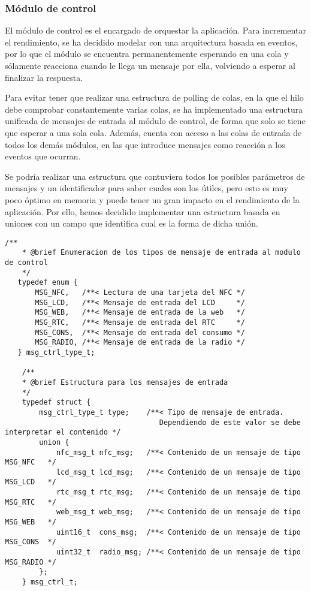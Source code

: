 \subsubsection{Módulo de control}

El módulo de control es el encargado de orquestar la aplicación. Para incrementar el rendimiento, se ha decidido modelar con una arquitectura basada en eventos, por lo que el módulo se encuentra permanentemente esperando en una cola y sólamente reacciona cuando le llega un mensaje por ella, volviendo a esperar al finalizar la respuesta.

Para evitar tener que realizar una estructura de polling de colas, en la que el hilo debe comprobar constantemente varias colas, se ha implementado una estructura unificada de mensajes de entrada al módulo de control, de forma que solo se tiene que esperar a una sola cola. Además, cuenta con acceso a las colas de entrada de todos los demás módulos, en las que introduce mensajes como reacción a los eventos que ocurran.

Se podría realizar una estructura que contuviera todos los posibles parámetros de mensajes y un identificador para saber cuales son los útiles, pero esto es muy poco óptimo en memoria y puede tener un gran impacto en el rendimiento de la aplicación. Por ello, hemos decidido implementar una estructura basada en uniones con un campo que identifica cual es la forma de dicha unión. 

\begin{lstlisting}[captionpos=t, caption={Estructura para los mensajes al control}]
    /**
    * @brief Enumeracion de los tipos de mensaje de entrada al modulo de control
    */
   typedef enum {
       MSG_NFC,   /**< Lectura de una tarjeta del NFC */
       MSG_LCD,   /**< Mensaje de entrada del LCD     */
       MSG_WEB,   /**< Mensaje de entrada de la web   */
       MSG_RTC,   /**< Mensaje de entrada del RTC     */
       MSG_CONS,  /**< Mensaje de entrada del consumo */
       MSG_RADIO, /**< Mensaje de entrada de la radio */
   } msg_ctrl_type_t;

    /**
    * @brief Estructura para los mensajes de entrada
    */
    typedef struct {
        msg_ctrl_type_t type;    /**< Tipo de mensaje de entrada. 
                                    Dependiendo de este valor se debe interpretar el contenido */
        union {
            nfc_msg_t nfc_msg;   /**< Contenido de un mensaje de tipo MSG_NFC   */
            lcd_msg_t lcd_msg;   /**< Contenido de un mensaje de tipo MSG_LCD   */
            rtc_msg_t rtc_msg;   /**< Contenido de un mensaje de tipo MSG_RTC   */
            web_msg_t web_msg;   /**< Contenido de un mensaje de tipo MSG_WEB   */
            uint16_t  cons_msg;  /**< Contenido de un mensaje de tipo MSG_CONS  */
            uint32_t  radio_msg; /**< Contenido de un mensaje de tipo MSG_RADIO */
        };
    } msg_ctrl_t;
\end{lstlisting}

